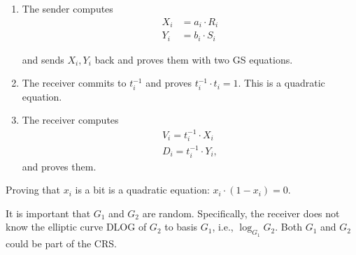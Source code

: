 {\begin{enumerate}
      The receiver
      commits to $x_i$ (and has to prove that $x_i$ is either a 0 or
      1, see below). The receiver sends both $R_i$ and $S_i$ proves them as GS equations.

      (Constants are $R_i,S_i$, and
      the -1 (there are some tricks), and variables are $x_i, V'_i$, and
      $D'_i$.)

      Therewith, the receiver has given a random shuffle (depending on
      $x_i$) of $V_i$ and $D_i$ to the sender. The sender does not
      know which of $R_i$ and $S_i$ is $V_i$ or $D_i$.
      
    \item The sender computes \begin{align}
                                X_i &= a_i \cdot R_i\\
                                Y_i &= b_i \cdot S_i
                                \end{align}

                                and sends $X_i,Y_i$ back and proves
                                them with two GS equations.

                              \item The receiver commits to $t_i^{-1}$
                                and proves $t_i^{-1}\cdot{}t_i = 1$. This is a quadratic equation.


                              \item The receiver computes
\begin{align}
  V_{i} = t_i^{-1} \cdot X_i\\
  D_{i} = t_i^{-1} \cdot Y_i,
\end{align}
and proves them.


\end{enumerate}

Proving that $x_i$ is a bit is a quadratic equation:
$x_i \cdot (1-x_i) = 0$.


It is important that $G_1$ and $G_2$ are random. Specifically, the
receiver does not know the elliptic curve DLOG of $G_2$ to basis
$G_1$, i.e., $\log_{G_1}{G_2}$. Both $G_1$ and $G_2$ could be part of
the CRS.
}%

